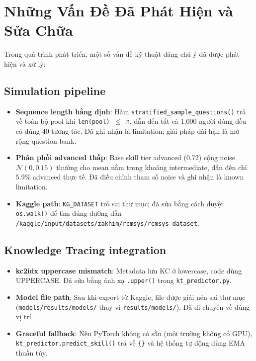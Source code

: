 \section{Những Vấn Đề Đã Phát Hiện và Sửa Chữa}
\label{sec:fixes}

Trong quá trình phát triển, một số vấn đề kỹ thuật đáng chú ý đã được phát hiện và xử lý:

\subsection{Simulation pipeline}
\begin{itemize}
  \item \textbf{Sequence length hằng định}: Hàm \texttt{stratified\_sample\_questions()} trả về toàn bộ pool khi \texttt{len(pool) $\leq$ n}, dẫn đến tất cả 1{,}000 người dùng đều có đúng 40 tương tác. Đã ghi nhận là limitation; giải pháp dài hạn là mở rộng question bank.
  \item \textbf{Phân phối advanced thấp}: Base skill tier advanced (0.72) cộng noise $\mathcal{N}(0, 0.15)$ thường cho mean nằm trong khoảng intermediate, dẫn đến chỉ 5.9\% advanced thực tế. Đã điều chỉnh tham số noise và ghi nhận là known limitation.
  \item \textbf{Kaggle path}: \texttt{KG\_DATASET} trỏ sai thư mục; đã sửa bằng cách duyệt \texttt{os.walk()} để tìm đúng đường dẫn \texttt{/kaggle/input/datasets/zakhim/rcmsys/rcmsys\_dataset}.
\end{itemize}

\subsection{Knowledge Tracing integration}
\begin{itemize}
  \item \textbf{kc2idx uppercase mismatch}: Metadata lưu KC ở lowercase, code dùng UPPERCASE. Đã sửa bằng ánh xạ \texttt{.upper()} trong \texttt{kt\_predictor.py}.
  \item \textbf{Model file path}: Sau khi export từ Kaggle, file được giải nén sai thư mục (\texttt{models/results/models/} thay vì \texttt{results/models/}). Đã di chuyển về đúng vị trí.
  \item \textbf{Graceful fallback}: Nếu PyTorch không có sẵn (môi trường không có GPU), \texttt{kt\_predictor.predict\_skill()} trả về \texttt{\{\}} và hệ thống tự động dùng EMA thuần túy.
\end{itemize}


